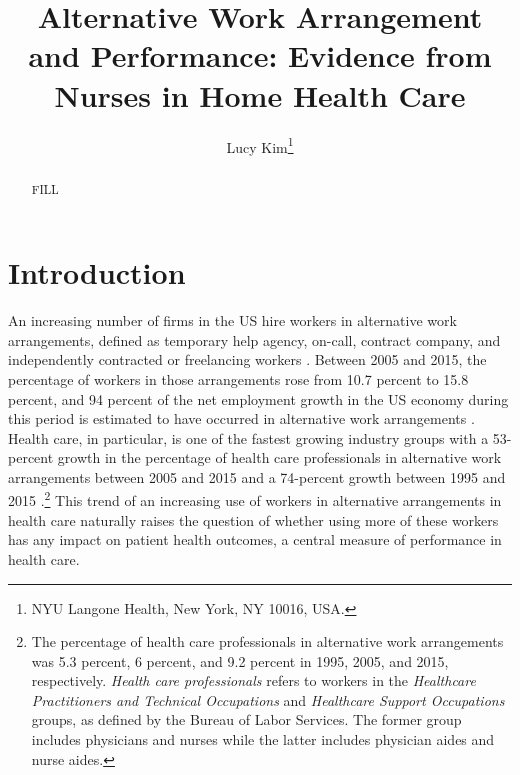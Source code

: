\documentclass[final,12pt]{article}
\title{Alternative Work Arrangement and Performance: Evidence from Nurses in Home Health Care}
\author{Lucy Kim\thanks{NYU Langone Health, New York, NY 10016, USA.}}
\date{\parbox{\linewidth}{\centering%
	January 2018 \hspace*{0cm} \endgraf\medskip
	}}
\begin{document}
\begin{singlespace}
\maketitle

\begin{abstract}
FILL
\end{abstract}

\end{singlespace}


\section{Introduction}

An increasing number of firms in the US hire workers in alternative work arrangements, defined as temporary help agency, on-call, contract company, and independently contracted or freelancing workers \citep{Katz2016}. Between 2005 and 2015, the percentage of workers in those arrangements rose from 10.7 percent to 15.8 percent, and 94 percent of the net employment growth in the US economy during this period is estimated to have occurred in alternative work arrangements \citep{Katz2016}. Health care, in particular, is one of the fastest growing industry groups with a 53-percent growth in the percentage of health care professionals in alternative work arrangements between 2005 and 2015 and a 74-percent growth between 1995 and 2015 \citep{Katz2016}.\footnote{The percentage of health care professionals in alternative work arrangements was 5.3 percent, 6 percent, and 9.2 percent in 1995, 2005, and 2015, respectively. \textit{Health care professionals} refers to workers in the \textit{Healthcare Practitioners and Technical Occupations} and \textit{Healthcare Support Occupations} groups, as defined by the Bureau of Labor Services. The former group includes physicians and nurses while the latter includes physician aides and nurse aides.}
This trend of an increasing use of workers in alternative arrangements in health care naturally raises the question of whether using more of these workers has any impact on patient health outcomes, a central measure of performance in health care.
\end{document}
